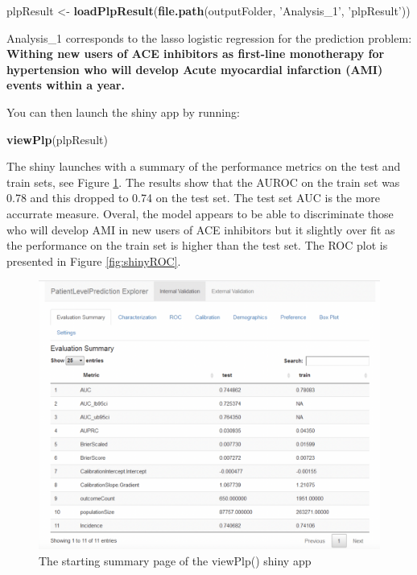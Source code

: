 \documentclass[11pt]{book}
\newenvironment{Shaded}{\begin{snugshade}}{\end{snugshade}}
\newcommand{\KeywordTok}[1]{\textcolor[rgb]{0.13,0.29,0.53}{\textbf{#1}}}
\newcommand{\StringTok}[1]{\textcolor[rgb]{0.31,0.60,0.02}{#1}}
\newcommand{\NormalTok}[1]{#1}
\begin{document}
\begin{Shaded}
\begin{Highlighting}[]
\NormalTok{plpResult <-}\StringTok{ }\KeywordTok{loadPlpResult}\NormalTok{(}\KeywordTok{file.path}\NormalTok{(outputFolder, }\StringTok{'Analysis_1'}\NormalTok{, }\StringTok{'plpResult'}\NormalTok{))}
\end{Highlighting}
\end{Shaded}

Analysis\_1 corresponds to the lasso logistic regression for the
prediction problem: \textbf{Withing new users of ACE inhibitors as
first-line monotherapy for hypertension who will develop Acute
myocardial infarction (AMI) events within a year.}

You can then launch the shiny app by running:

\begin{Shaded}
\begin{Highlighting}[]
\KeywordTok{viewPlp}\NormalTok{(plpResult)}
\end{Highlighting}
\end{Shaded}

The shiny launches with a summary of the performance metrics on the test
and train sets, see Figure \ref{fig:shinySum}. The results show that the
AUROC on the train set was 0.78 and this dropped to 0.74 on the test
set. The test set AUC is the more accurrate measure. Overal, the model
appears to be able to discriminate those who will develop AMI in new
users of ACE inhibitors but it slightly over fit as the performance on
the train set is higher than the test set. The ROC plot is presented in
Figure \ref{fig:shinyROC}.

\begin{figure}

{\centering \includegraphics[width=0.8\linewidth]{images/PatientLevelPrediction/shiny/singleShiny/singleShinySummary} 

}

\caption{The starting summary page of the viewPlp() shiny app}\label{fig:shinySum}
\end{figure}
\end{document}
